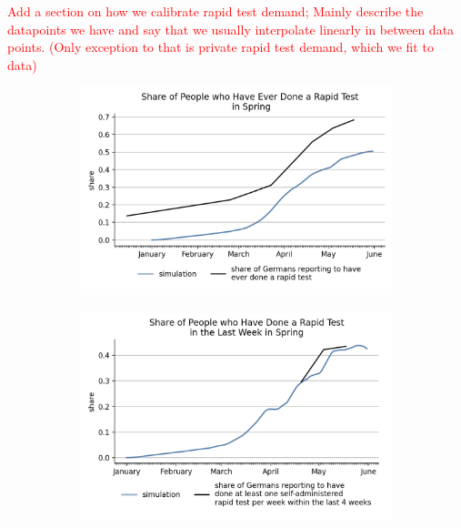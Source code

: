 


\textcolor{red}{
    Add a section on how we calibrate rapid test demand; Mainly describe the
    datapoints we have and say that we usually interpolate linearly in between data
    points. (Only exception to that is private rapid test demand, which we fit to data)
}


\begin{figure}[ht]
    \centering
    \caption{Share of Individuals With Rapid Tests}
    \label{fig:share_ever_rapid_test}
    \begin{subfigure}{.55\textwidth}
      \includegraphics[width=0.9 \textwidth]{../figures/results/figures/scenario_comparisons/spring_fit/full_share_ever_rapid_test}
    \end{subfigure}%
    \begin{subfigure}{.55\textwidth}
      \includegraphics[width=0.9 \textwidth]{../figures/results/figures/scenario_comparisons/spring_fit/full_share_rapid_test_in_last_week}
    \end{subfigure}

\end{figure}
